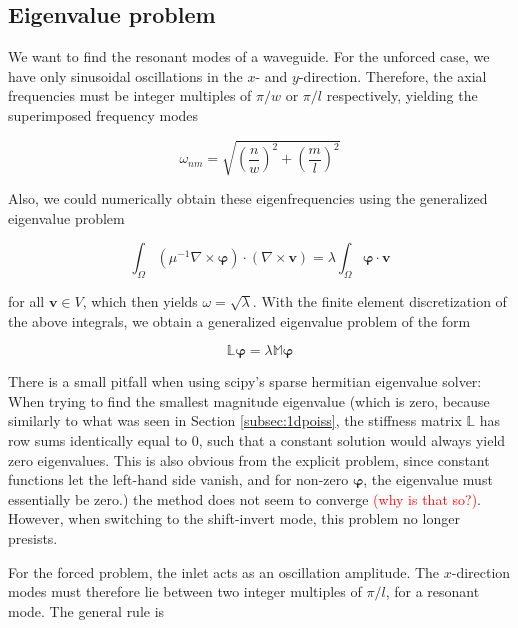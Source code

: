 \documentclass[11pt, a4paper]{article}
\begin{document}
\subsection{Eigenvalue problem}
\label{subsec:evp}

We want to find the resonant modes of a waveguide. For the unforced case,
we have only sinusoidal oscillations in the $x$- and $y$-direction. Therefore,
the axial frequencies must be integer multiples of $\pi/w$ or $\pi/l$ respectively,
yielding the superimposed frequency modes

\begin{equation}
    \omega_{nm} = \sqrt{\left(\frac{n}{w}\right)^2 + \left(\frac{m}{l}\right)^2}
\end{equation}

Also, we could numerically obtain these eigenfrequencies using the generalized
eigenvalue problem

\begin{equation}
    \int_{\Omega} (\mu^{-1} \nabla \times \boldsymbol{\varphi}) \cdot (\nabla \times \mathbf{v})
    = \lambda \int_{\Omega} \boldsymbol{\varphi} \cdot \mathbf{v}
\end{equation}

for all $\mathbf{v} \in V$, which then yields $\omega = \sqrt{\lambda}$.
With the finite element discretization of the above integrals, we obtain a
generalized eigenvalue problem of the form

\begin{equation}
    \mathbb{L} \boldsymbol{\varphi} = \lambda \mathbb{M} \boldsymbol{\varphi}
\end{equation}

There is a small pitfall when using scipy's sparse hermitian eigenvalue solver:
When trying to find the smallest magnitude eigenvalue (which is zero, because
similarly to what was seen in Section \ref{subsec:1dpoiss}, the stiffness matrix
$\mathbb{L}$ has row sums identically equal to 0, such that a constant solution 
would always yield zero eigenvalues. This is also obvious from the explicit problem,
since constant functions let the left-hand side vanish, and for non-zero 
$\boldsymbol{\varphi}$, the eigenvalue must essentially be zero.)
the method does not seem
to converge \textcolor{red}{(why is that so?)}. However, when switching to the 
shift-invert mode, this problem no longer presists.

For the forced problem, the inlet acts as an oscillation amplitude. The $x$-direction 
modes must therefore lie between two integer multiples of $\pi/l$, for a resonant 
mode. The general rule is 
\end{document}
